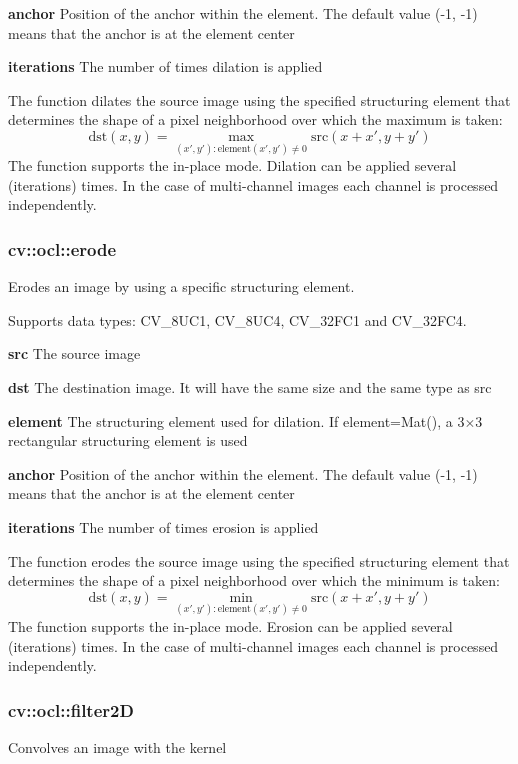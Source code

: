 \documentclass{article}
\begin{document}
\textbf{anchor }Position of the anchor within the element. The default value
(-1, -1) means that the anchor is at the element center

\textbf{iterations }The number of times dilation is applied

The function dilates the source image using the specified structuring
element that determines the shape of a pixel neighborhood over which the
maximum is taken:
\[
\mbox{dst}(x,y)=\mathop {\max
}\limits_{({x}',{y}'):\mbox{element}({x}',{y}')\ne 0}
\mbox{src}(x+{x}',y+{y}')
\]
The function supports the in-place mode. Dilation can be applied several
(iterations) times. In the case of multi-channel images each channel is
processed independently.

\newpage

\subsubsection{cv::ocl::erode}
\label{subsubsec:mylabel36}
Erodes an image by using a specific structuring element.

Supports data types: CV{\_}8UC1, CV{\_}8UC4, CV{\_}32FC1 and CV{\_}32FC4.

\textbf{src }The source image

\textbf{dst }The destination image. It will have the same size and the same
type as src

\textbf{element }The structuring element used for dilation. If
element=Mat(), a 3$\times $3 rectangular structuring element is used

\textbf{anchor }Position of the anchor within the element. The default value
(-1, -1) means that the anchor is at the element center

\textbf{iterations }The number of times erosion is applied

The function erodes the source image using the specified structuring element
that determines the shape of a pixel neighborhood over which the minimum is
taken:
\[
\mbox{dst}(x,y)=\mathop {\min
}\limits_{({x}',{y}'):\mbox{element}({x}',{y}')\ne 0}
\mbox{src}(x+{x}',y+{y}')
\]
The function supports the in-place mode. Erosion can be applied several
(iterations) times. In the case of multi-channel images each channel is
processed independently.

\newpage

\subsubsection{cv::ocl::filter2D }
\label{subsubsec:mylabel37}
Convolves an image with the kernel
\end{document}
